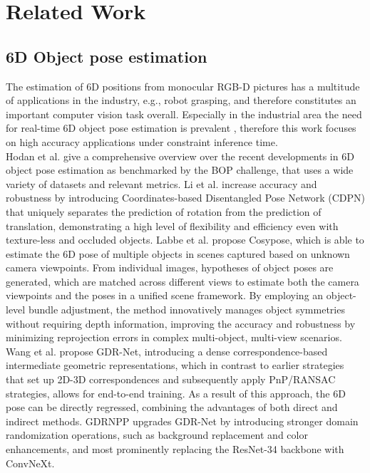 \section{Related Work}
\subsection{6D Object pose estimation}

The estimation of 6D positions from monocular RGB-D pictures has a multitude of applications in the industry, e.g., robot grasping, and therefore constitutes an important computer vision task overall.
Especially in the industrial area the need for real-time 6D object pose estimation is prevalent \cite{gorschluter2022survey}, therefore this work focuses on high accuracy applications under constraint inference time.\\
%
Hodan et al. \cite{hodan2024bop} give a comprehensive overview over the recent developments in 6D object pose estimation as benchmarked by the BOP challenge, that uses a wide variety of datasets and relevant metrics.
Li et al. \cite{li2019cdpn} increase accuracy and robustness by introducing Coordinates-based Disentangled Pose Network (CDPN) that uniquely separates the prediction of rotation from the prediction of translation, demonstrating a high level of flexibility and efficiency even with texture-less and occluded objects.
Labbe et al. \cite{labbe2020cosypose} propose Cosypose, which is able to estimate the 6D pose of multiple objects in scenes captured based on unknown camera viewpoints. From individual images, hypotheses of object poses are generated, which are matched  across different views to estimate both the camera viewpoints and the poses in a unified scene framework.
By employing an object-level bundle adjustment, the method innovatively manages object symmetries without requiring depth information, improving the accuracy and robustness  by minimizing reprojection errors in complex multi-object, multi-view scenarios.
Wang et al. \cite{wang2021gdr} propose GDR-Net, introducing a dense correspondence-based intermediate geometric representations, which in contrast to earlier strategies that set up 2D-3D correspondences and subsequently apply PnP/RANSAC strategies, allows for end-to-end training. As a result of this approach, the 6D pose can be directly regressed, combining the advantages of both direct and indirect methods.
GDRNPP \cite{liuShanicelGdrnpp_bop20222024} upgrades GDR-Net by introducing stronger domain randomization operations, such as background replacement and color enhancements, and most prominently replacing the ResNet-34 backbone with ConvNeXt.
